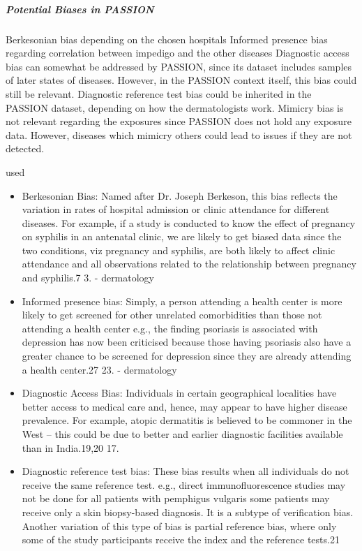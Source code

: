 \documentclass[12pt, a4paper, oneside]{book}   	%
\newif\ifrawcitationactive
\newcommand{\rawcitationstart}{
	\color{purple}\rawcitationactivetrue
}
\newcommand{\rawcitationusedstart}{\color{violet}}
\begin{document}
			\subparagraph{Potential Biases in PASSION}
			Berkesonian bias depending on the chosen hospitals
			Informed presence bias regarding correlation between impedigo and the other diseases
			Diagnostic access bias can somewhat be addressed by PASSION, since its dataset includes samples of later states of diseases. However, in the PASSION context itself, this bias could still be relevant.
			Diagnostic reference test bias could be inherited in the PASSION dataset, depending on how the dermatologists work.
			Mimicry bias is not relevant regarding the exposures since PASSION does not hold any exposure data. However, diseases which mimicry others could lead to issues if they are not detected.
			
			
			
			\rawcitationstart
			used
			\begin{itemize}		
				\rawcitationusedstart
				\item Berkesonian Bias: Named after Dr. Joseph Berkeson, this bias reflects the variation in rates of hospital admission or clinic attendance for different diseases. For example, if a study is conducted to know the effect of pregnancy on syphilis in an antenatal clinic, we are likely to get biased data since the two conditions, viz pregnancy and syphilis, are both likely to affect clinic attendance and all observations related to the relationship between pregnancy and syphilis.7 3. \autocite{Chakraborty_2024} - dermatology
				
				\item  Informed presence bias: Simply, a person attending a health center is more likely to get screened for other unrelated comorbidities than those not attending a health center e.g., the finding psoriasis is associated with depression has now been criticised because those having psoriasis also have a greater chance to be screened for depression since they are already attending a health center.27 23. \autocite{Chakraborty_2024} - dermatology	
				
				\item  Diagnostic Access Bias: Individuals in certain geographical localities have better access to medical care and, hence, may appear to have higher disease prevalence. For example, atopic dermatitis is believed to be commoner in the West – this could be due to better and earlier diagnostic facilities available than in India.19,20 17.\autocite{Chakraborty_2024}
				
				\item  Diagnostic reference test bias: These bias results when all individuals do not receive the same reference test. e.g., direct immunofluorescence studies may not be done for all patients with pemphigus vulgaris some patients may receive only a skin biopsy-based diagnosis. It is a subtype of verification bias. Another variation of this type of bias is partial reference bias, where only some of the study participants receive the index and the reference tests.21\autocite{Chakraborty_2024}
				

\end{itemize}
\end{document}
